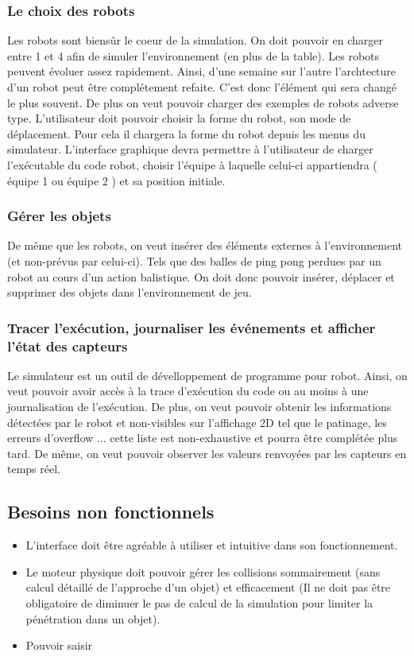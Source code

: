 \subsubsection{Le choix des robots}
Les robots sont biensûr le coeur de la simulation. On doit pouvoir en charger entre 1 et 4 afin de simuler l'environnement (en plus de la table). Les robots peuvent évoluer assez rapidement. Ainsi, d'une semaine sur l'autre l'archtecture d'un robot peut être complétement refaite. C'est donc l'élément qui sera changé le plus souvent. De plus on veut pouvoir charger des exemples de robots adverse type. L'utilisateur doit pouvoir choisir la forme du robot, son mode de déplacement. Pour cela il chargera la forme du robot depuis les menus du simulateur. L'interface graphique devra permettre à l'utilisateur de charger l'exécutable du code robot, choisir l'équipe à laquelle celui-ci appartiendra ( équipe 1 ou équipe 2 ) et sa position initiale. 
 
\subsubsection{Gérer les objets}
De même que les robots, on veut insérer des éléments externes à l'environnement (et non-prévus par celui-ci). Tels que des balles de ping pong perdues par un robot au cours d'un action balistique. On doit donc pouvoir insérer, déplacer et supprimer des objets dans l'environnement de jeu.

\subsubsection{Tracer l'exécution, journaliser les événements et afficher l'état des capteurs}
Le simulateur est un outil de dévelloppement de programme pour robot. Ainsi, on veut pouvoir avoir accès à la trace d'exécution du code ou au moins à une journalisation de l'exécution. De plus, on veut pouvoir obtenir les informations détectées par le robot et non-visibles sur l'affichage 2D tel que le patinage, les erreurs d'overflow ... cette liste est non-exhaustive et pourra être complétée plus tard. De même, on veut pouvoir observer les valeurs renvoyées par les capteurs en temps réel.
   
\subsection{Besoins non fonctionnels}

\begin{itemize}
    \item L'interface doit être agréable à utiliser et intuitive dans son fonctionnement.
    \item Le moteur physique doit pouvoir gérer les collisions sommairement (sans calcul détaillé de l'approche d'un objet) et efficacement (Il ne doit pas être obligatoire de diminuer le pas de calcul de la simulation pour limiter la pénétration dans un objet).
    \item Pouvoir saisir
\end{itemize}

